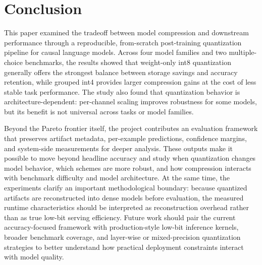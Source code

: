 \documentclass[11pt,twocolumn]{article}
\begin{document}
\section{Conclusion}
This paper examined the tradeoff between model compression and downstream performance through a reproducible, from-scratch post-training quantization pipeline for causal language models. Across four model families and two multiple-choice benchmarks, the results showed that weight-only int8 quantization generally offers the strongest balance between storage savings and accuracy retention, while grouped int4 provides larger compression gains at the cost of less stable task performance. The study also found that quantization behavior is architecture-dependent: per-channel scaling improves robustness for some models, but its benefit is not universal across tasks or model families.

Beyond the Pareto frontier itself, the project contributes an evaluation framework that preserves artifact metadata, per-example predictions, confidence margins, and system-side measurements for deeper analysis. These outputs make it possible to move beyond headline accuracy and study when quantization changes model behavior, which schemes are more robust, and how compression interacts with benchmark difficulty and model architecture. At the same time, the experiments clarify an important methodological boundary: because quantized artifacts are reconstructed into dense models before evaluation, the measured runtime characteristics should be interpreted as reconstruction overhead rather than as true low-bit serving efficiency. Future work should pair the current accuracy-focused framework with production-style low-bit inference kernels, broader benchmark coverage, and layer-wise or mixed-precision quantization strategies to better understand how practical deployment constraints interact with model quality.



\end{document}
